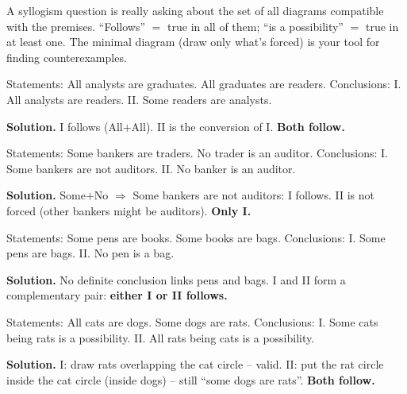 \documentclass[11pt,a4paper,openany]{report}
\begin{document}
\begin{why}
A syllogism question is really asking about the set of all diagrams compatible with the premises. ``Follows'' $=$ true in all of them; ``is a possibility'' $=$ true in at least one. The minimal diagram (draw only what's forced) is your tool for finding counterexamples.
\end{why}

\begin{example}
Statements: All analysts are graduates. All graduates are readers.
Conclusions: I. All analysts are readers. II. Some readers are analysts.

\textbf{Solution.} I follows (All$+$All). II is the conversion of I. \textbf{Both follow.}
\end{example}

\begin{example}
Statements: Some bankers are traders. No trader is an auditor.
Conclusions: I. Some bankers are not auditors. II. No banker is an auditor.

\textbf{Solution.} Some$+$No $\Rightarrow$ Some bankers are not auditors: I follows. II is not forced (other bankers might be auditors). \textbf{Only I.}
\end{example}

\begin{example}
Statements: Some pens are books. Some books are bags.
Conclusions: I. Some pens are bags. II. No pen is a bag.

\textbf{Solution.} No definite conclusion links pens and bags. I and II form a complementary pair: \textbf{either I or II follows.}
\end{example}

\begin{example}[possibility]
Statements: All cats are dogs. Some dogs are rats.
Conclusions: I. Some cats being rats is a possibility. II. All rats being cats is a possibility.

\textbf{Solution.} I: draw rats overlapping the cat circle -- valid. II: put the rat circle inside the cat circle (inside dogs) -- still ``some dogs are rats''. \textbf{Both follow.}
\end{example}
\end{document}
